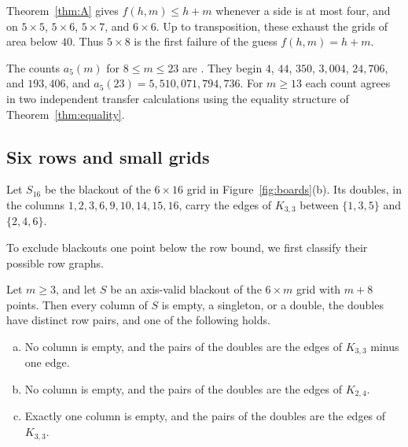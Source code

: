Theorem~\ref{thm:A} gives $f(h,m)\le h+m$ whenever a side is at most
four, and on $5\times5$, $5\times6$, $5\times7$, and $6\times6$.
Up to transposition, these exhaust the grids of area below $40$.
Thus $5\times8$ is the first failure of the guess $f(h,m)=h+m$.

\begin{remark}\label{rem:fivecounts}
The counts $a_5(m)$ for $8\le m\le23$ are . They begin $4$, $44$, $350$,
$3{,}004$, $24{,}706$, and $193{,}406$, and $a_5(23)=5{,}510{,}071{,}794{,}736$. For $m\ge13$
each count agrees in two independent transfer calculations using the equality structure of
Theorem~\ref{thm:equality}.
\end{remark}

\subsection{Six rows and small grids}

Let $S_{16}$ be the blackout of the $6\times16$ grid in Figure~\ref{fig:boards}(b). Its doubles,
in the columns $1,2,3,6,9,10,14,15,16$, carry the edges of $K_{3,3}$ between $\{1,3,5\}$ and
$\{2,4,6\}$.

To exclude blackouts one point below the row bound, we first classify
their possible row graphs.

\begin{lemma}\label{lem:sixbelow}
Let $m\ge3$, and let $S$ be an axis-valid blackout of the $6\times m$ grid with $m+8$ points.
Then every column of $S$ is empty, a singleton, or a double, the doubles have distinct row
pairs, and one of the following holds.
\begin{enumerate}[(a)]
\item No column is empty, and the pairs of the doubles are the edges of $K_{3,3}$ minus one edge.
\item No column is empty, and the pairs of the doubles are the edges of $K_{2,4}$.
\item Exactly one column is empty, and the pairs of the doubles are the edges of $K_{3,3}$.
\end{enumerate}
\end{lemma}

